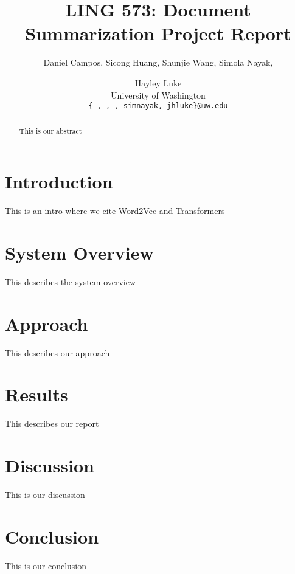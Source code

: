 \documentclass[11pt]{article}
\title{LING 573: Document Summarization Project Report}
\author{Daniel Campos, Sicong Huang, Shunjie Wang, Simola Nayak, \and Hayley Luke \\ University of Washington \\ {\tt \{ , , , simnayak, jhluke\}@uw.edu}}
\date{}
\begin{document}
\maketitle
\begin{abstract}
This is our abstract
\end{abstract}
\section{Introduction}
This is an intro where we cite Word2Vec \cite{Mikolov2013DistributedRO} and Transformers \cite{Wolf2019HuggingFacesTS}
\section{System Overview}
This describes the system overview
\section{Approach}
This describes our approach
\section{Results}
This describes our report
\section{Discussion}
This is our discussion
\section{Conclusion}
This is our conclusion


\end{document}
